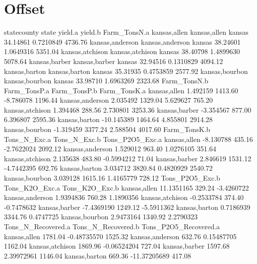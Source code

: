 \documentclass{report}
\begin{document}
\section{Offset}
\begin{Schunk}
\begin{Soutput}
                    statecounty  state  yield.a   yield.b Farm_TonsN.a
kansas,allen       kansas,allen kansas 34.14861 0.7210849      4736.76
kansas,anderson kansas,anderson kansas 38.24601 1.0649316      5351.04
kansas,atchison kansas,atchison kansas 38.40798 1.4899630      5078.64
kansas,barber     kansas,barber kansas 32.94516 0.1310829      4094.12
kansas,barton     kansas,barton kansas 35.31935 0.4753859      2577.92
kansas,bourbon   kansas,bourbon kansas 33.98710 1.6963269      2323.68
                Farm_TonsN.b Farm_TonsP.a Farm_TonsP.b Farm_TonsK.a
kansas,allen        1.492159      1413.60    -8.786078      1196.44
kansas,anderson     2.035492      1329.04     5.629627       765.20
kansas,atchison     1.394468       288.56     2.730801      3253.36
kansas,barber      -3.354567       877.00     6.396807      2595.36
kansas,barton     -10.145389      1464.64     4.855801      2914.28
kansas,bourbon     -1.319459      3377.24     2.588504      4017.60
                Farm_TonsK.b Tons_N_Exc.a Tons_N_Exc.b Tons_P2O5_Exc.a
kansas,allen       -8.130788       435.16   -2.7622024         2092.12
kansas,anderson     1.529012       963.40    1.0276105          351.64
kansas,atchison     2.135638       483.80   -0.5994212           71.04
kansas,barber       2.846619      1531.12   -4.7442395          692.76
kansas,barton       3.034712      3820.84    0.4820929         2540.72
kansas,bourbon      3.039128      1615.16    1.4165779          728.12
                Tons_P2O5_Exc.b Tons_K2O_Exc.a Tons_K2O_Exc.b
kansas,allen         11.1351165         329.24     -3.4260722
kansas,anderson       1.9394836         760.28      1.1890356
kansas,atchison      -0.2533784         374.40     -0.7478632
kansas,barber        -7.4369190        1249.12     -5.5911362
kansas,barton         0.7186939        3344.76      0.4747725
kansas,bourbon        2.9473164        1340.92      2.2790323
                Tons_N_Recovered.a Tons_N_Recovered.b Tons_P2O5_Recovered.a
kansas,allen               1781.04        -0.48735570               1525.32
kansas,anderson             632.76         0.15487705               1162.04
kansas,atchison            1869.96        -0.06524204                727.04
kansas,barber              1597.68         2.39972961               1146.04
kansas,barton               669.36       -11.37205689                417.08

\end{Soutput}
\end{Schunk}
\end{document}
